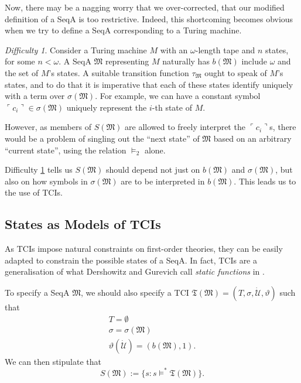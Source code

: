 \documentclass[12pt, twoside]{memoir}
\numberwithin{equation}{section}
\theoremstyle{definition}
\theoremstyle{remark}
\newtheorem{diff}[thm]{Difficulty}
\theoremstyle{definition}
\theoremstyle{definition}
\theoremstyle{definition}
\theoremstyle{remark}
\begin{document}
Now, there may be a nagging worry that we over-corrected, that our modified definition of a SeqA is too restrictive. Indeed, this shortcoming becomes obvious when we try to define a SeqA corresponding to a Turing machine.

\begin{diff}\label{diff29}
Consider a Turing machine $M$ with an $\omega$-length tape and $n$ states, for some $n < \omega$. A SeqA $\mathfrak{M}$ representing $M$ naturally has $b(\mathfrak{M})$ include $\omega$ and the set of $M$'s states. A suitable transition function $\tau_{\mathfrak{M}}$ ought to speak of $M$'s states, and to do that it is imperative that each of these states identify uniquely with a term over $\sigma(\mathfrak{M})$. For example, we can have a constant symbol $\ulcorner c_i \urcorner \in \sigma(\mathfrak{M})$ uniquely represent the $i$-th state of $M$. 

However, as members of $S(\mathfrak{M})$ are allowed to freely interpret the $\ulcorner c_i \urcorner$s, there would be a problem of singling out the ``next state'' of $\mathfrak{M}$ based on an arbitrary ``current state'', using the relation $\models_2$ alone.
\end{diff}

Difficulty \ref{diff29} tells us $S(\mathfrak{M})$ should depend not just on $b(\mathfrak{M})$ and $\sigma(\mathfrak{M})$, but also on how symbols in $\sigma(\mathfrak{M})$ are to be interpreted in $b(\mathfrak{M})$. This leads us to the use of TCIs.

\subsection{States as Models of TCIs}\label{ssect23}

As TCIs impose natural constraints on first-order theories, they can be easily adapted to constrain the possible states of a SeqA. In fact, TCIs are a generalisation of what Dershowitz and Gurevich call \textit{static functions} in \cite{dershowitz}.

To specify a SeqA $\mathfrak{M}$, we should also specify a TCI $\mathfrak{T}(\mathfrak{M}) = (T, \sigma, \dot{\mathcal{U}}, \vartheta)$ such that 
\begin{gather*}
    T = \emptyset \\
    \sigma = \sigma(\mathfrak{M}) \\
    \vartheta(\dot{\mathcal{U}}) = (b(\mathfrak{M}), 1).
\end{gather*}
We can then stipulate that 
\begin{equation*}
    S(\mathfrak{M}) := \{s : s \models^* \mathfrak{T}(\mathfrak{M})\} \text{.}
\end{equation*}
\end{document}
